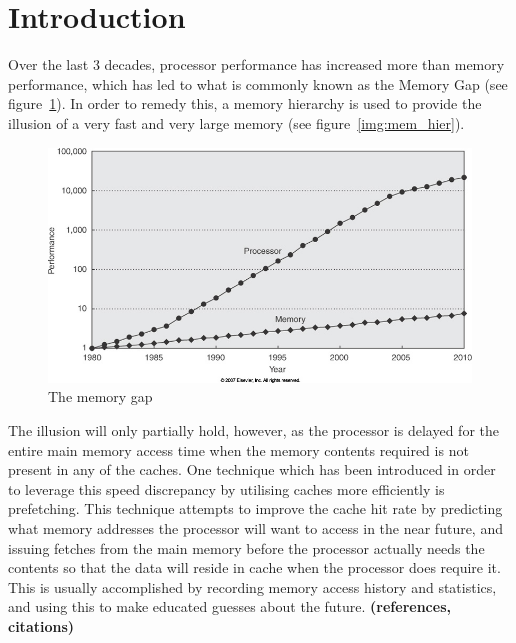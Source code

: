 
\section{Introduction}
\label{sec:introduction}
Over the last 3 decades, processor performance has increased more than memory performance,
which has led to what is commonly known as the Memory Gap (see figure~\ref{img:mem_gap}). In order to remedy this, a memory
hierarchy is used to provide the illusion of a very fast and very
large memory (see figure~\ref{img:mem_hier}). 

\begin{figure}[H]
	\centering
	\includegraphics[scale=0.3]{./img/mem_gap}
	\caption{The memory gap}
	\label{img:mem_gap}
\end{figure}

The illusion will only partially hold, however, as the processor is
delayed for the entire main memory access time when the memory contents required
is not present in any of the caches. One technique
which has been introduced in order to leverage this speed discrepancy
by utilising caches more efficiently is prefetching. This technique
attempts to improve the cache hit rate by predicting what memory
addresses the processor will want to access in the near future, and
issuing fetches from the main memory before the processor actually
needs the contents so that the data will reside in cache when the
processor does require it. This is usually accomplished by recording
memory access history and statistics, and using this to make educated
guesses about the future. 
{\bf (references, citations)}

